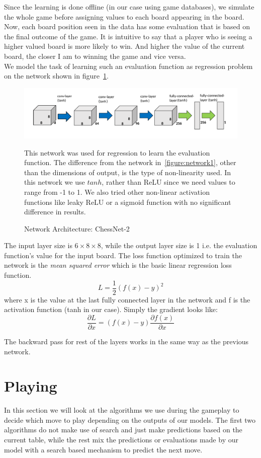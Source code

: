 Since the learning is done offline (in our case using game databases), we 
simulate the whole game before assigning values to each board appearing in the 
board. Now, each board position seen in the data has some evaluation that is 
based on the final outcome of the game. It is intuitive to say that a player who 
is seeing a higher valued board is more likely to win. And higher the value of 
the current board, the closer I am to winning the game and vice versa.\\

We model the task of learning such an evaluation function as regression problem 
on the network shown in figure~\ref{figure:network2}.
\begin{figure}[h]
\includegraphics[width=1.0\textwidth,center]{img/net3.png}

\caption{Network Architecture: ChessNet-2}
\small\centering
This network was used for regression to learn the evaluation function. The 
difference from the network in~\ref{figure:network1}, other than the dimensions 
of output, is the type of non-linearity used. In this network we use $tanh$, 
rather than ReLU since we need values to range from -1 to 1. We also tried 
other non-linear activation functions like leaky ReLU or a sigmoid function 
with no significant difference in results.
\label{figure:network2}
\end{figure}

The input layer size is $6\times 8\times 8$, while the output layer size is 1 
i.e. the evaluation function's value for the input board. The loss function 
optimized to train the network is the \textit{mean squared error} which is the 
basic linear regression loss function.
\[L = \frac{1}{2}(f(x)-y)^2\] where x is the value at the last fully 
connected layer in the network and f is the activation function (tanh in our 
case).
Simply the gradient looks like:
\[\frac{\partial L}{\partial x} = (f(x)-y)\frac{\partial f(x)}{\partial x}\]

The backward pass for rest of the layers works in the same way as the previous 
network.

\section{Playing}
\label{section:playing}
In this section we will look at the algorithms we use during the gameplay to 
decide which move to play depending on the outputs of our models. The first two 
algorithms do not make use of search and just make predictions based on the 
current table, while the rest mix the predictions or evaluations made by our 
model with a search based mechanism to predict the next move.


